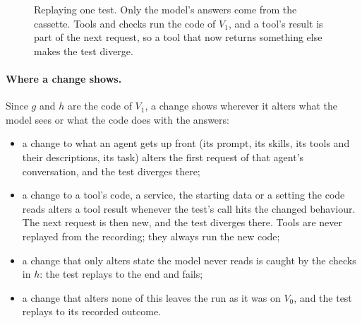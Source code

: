 \documentclass[11pt,a4paper]{article}
\begin{document}
\begin{figure}[h]
\centering
{}
\caption{Replaying one test. Only the model's answers come from the cassette. Tools and checks run the code of
$V_1$, and a tool's result is part of the next request, so a tool that now returns something else makes the test
diverge.}
\label{fig:run}
\end{figure}

\paragraph{Where a change shows.} Since $g$ and $h$ are the code of $V_1$, a change shows wherever it alters what
the model sees or what the code does with the answers:
\begin{itemize}
  \item a change to what an agent gets up front (its prompt, its skills, its tools and their descriptions, its
        task) alters the first request of that agent's conversation, and the test diverges there;
  \item a change to a tool's code, a service, the starting data or a setting the code reads alters a tool result
        whenever the test's call hits the changed behaviour. The next request is then new, and the test diverges
        there. Tools are never replayed from the recording; they always run the new code;
  \item a change that only alters state the model never reads is caught by the checks in $h$: the test replays to
        the end and fails;
  \item a change that alters none of this leaves the run as it was on $V_0$, and the test replays to its recorded
        outcome.
\end{itemize}
\end{document}
